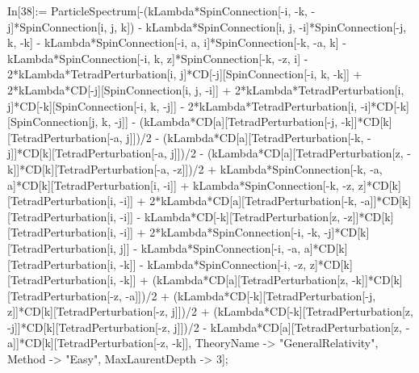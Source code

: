 In[38]:= ParticleSpectrum[-(kLambda*SpinConnection[-i, -k, -j]*SpinConnection[i, j, k]) - kLambda*SpinConnection[i, j, -i]*SpinConnection[-j, k, -k] - kLambda*SpinConnection[-i, a, i]*SpinConnection[-k, -a, k] - kLambda*SpinConnection[-i, k, z]*SpinConnection[-k, -z, i] - 2*kLambda*TetradPerturbation[i, j]*CD[-j][SpinConnection[-i, k, -k]] + 2*kLambda*CD[-j][SpinConnection[i, j, -i]] + 2*kLambda*TetradPerturbation[i, j]*CD[-k][SpinConnection[-i, k, -j]] - 2*kLambda*TetradPerturbation[i, -i]*CD[-k][SpinConnection[j, k, -j]] - (kLambda*CD[a][TetradPerturbation[-j, -k]]*CD[k][TetradPerturbation[-a, j]])/2 - (kLambda*CD[a][TetradPerturbation[-k, -j]]*CD[k][TetradPerturbation[-a, j]])/2 - (kLambda*CD[a][TetradPerturbation[z, -k]]*CD[k][TetradPerturbation[-a, -z]])/2 + kLambda*SpinConnection[-k, -a, a]*CD[k][TetradPerturbation[i, -i]] + kLambda*SpinConnection[-k, -z, z]*CD[k][TetradPerturbation[i, -i]] + 2*kLambda*CD[a][TetradPerturbation[-k, -a]]*CD[k][TetradPerturbation[i, -i]] - kLambda*CD[-k][TetradPerturbation[z, -z]]*CD[k][TetradPerturbation[i, -i]] + 2*kLambda*SpinConnection[-i, -k, -j]*CD[k][TetradPerturbation[i, j]] - kLambda*SpinConnection[-i, -a, a]*CD[k][TetradPerturbation[i, -k]] - kLambda*SpinConnection[-i, -z, z]*CD[k][TetradPerturbation[i, -k]] + (kLambda*CD[a][TetradPerturbation[z, -k]]*CD[k][TetradPerturbation[-z, -a]])/2 + (kLambda*CD[-k][TetradPerturbation[-j, z]]*CD[k][TetradPerturbation[-z, j]])/2 + (kLambda*CD[-k][TetradPerturbation[z, -j]]*CD[k][TetradPerturbation[-z, j]])/2 - kLambda*CD[a][TetradPerturbation[z, -a]]*CD[k][TetradPerturbation[-z, -k]], TheoryName -> "GeneralRelativity", Method -> "Easy", MaxLaurentDepth -> 3]; 